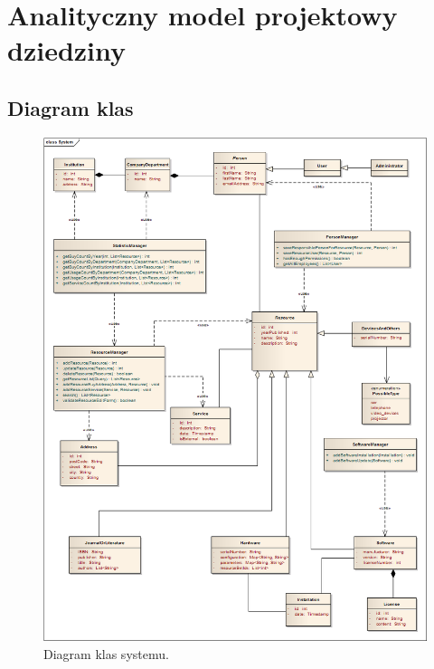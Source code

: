 \section{Analityczny model projektowy dziedziny}
\subsection{Diagram klas}
\begin{figure}[h!]
	\centering
	\includegraphics[scale=0.4]{img/class-diagram2}
	\caption{Diagram klas systemu.\label{fig:labelClassDiagram}}
\end{figure}

\newpage 


